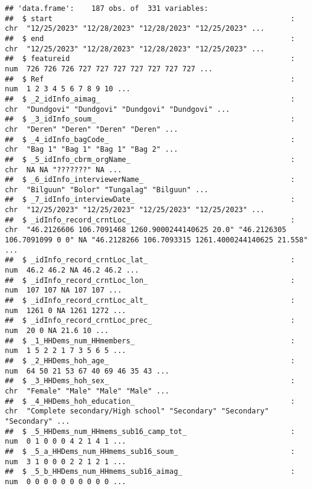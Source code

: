 \documentclass[
]{article}
\begin{document}
\begin{verbatim}
## 'data.frame':    187 obs. of  331 variables:
##  $ start                                                       : chr  "12/25/2023" "12/28/2023" "12/28/2023" "12/25/2023" ...
##  $ end                                                         : chr  "12/25/2023" "12/28/2023" "12/28/2023" "12/25/2023" ...
##  $ featureid                                                   : num  726 726 726 727 727 727 727 727 727 727 ...
##  $ Ref                                                         : num  1 2 3 4 5 6 7 8 9 10 ...
##  $ _2_idInfo_aimag_                                            : chr  "Dundgovi" "Dundgovi" "Dundgovi" "Dundgovi" ...
##  $ _3_idInfo_soum_                                             : chr  "Deren" "Deren" "Deren" "Deren" ...
##  $ _4_idInfo_bagCode_                                          : chr  "Bag 1" "Bag 1" "Bag 1" "Bag 2" ...
##  $ _5_idInfo_cbrm_orgName_                                     : chr  NA NA "???????" NA ...
##  $ _6_idInfo_interviewerName_                                  : chr  "Bilguun" "Bolor" "Tungalag" "Bilguun" ...
##  $ _7_idInfo_interviewDate_                                    : chr  "12/25/2023" "12/25/2023" "12/25/2023" "12/25/2023" ...
##  $ _idInfo_record_crntLoc_                                     : chr  "46.2126606 106.7091468 1260.9000244140625 20.0" "46.2126305 106.7091099 0 0" NA "46.2128266 106.7093315 1261.4000244140625 21.558" ...
##  $ _idInfo_record_crntLoc_lat_                                 : num  46.2 46.2 NA 46.2 46.2 ...
##  $ _idInfo_record_crntLoc_lon_                                 : num  107 107 NA 107 107 ...
##  $ _idInfo_record_crntLoc_alt_                                 : num  1261 0 NA 1261 1272 ...
##  $ _idInfo_record_crntLoc_prec_                                : num  20 0 NA 21.6 10 ...
##  $ _1_HHDems_num_HHmembers_                                    : num  1 5 2 2 1 7 3 5 6 5 ...
##  $ _2_HHDems_hoh_age_                                          : num  64 50 21 53 67 40 69 46 35 43 ...
##  $ _3_HHDems_hoh_sex_                                          : chr  "Female" "Male" "Male" "Male" ...
##  $ _4_HHDems_hoh_education_                                    : chr  "Complete secondary/High school" "Secondary" "Secondary" "Secondary" ...
##  $ _5_HHDems_num_HHmems_sub16_camp_tot_                        : num  0 1 0 0 0 4 2 1 4 1 ...
##  $ _5_a_HHDems_num_HHmems_sub16_soum_                          : num  3 1 0 0 0 2 2 1 2 1 ...
##  $ _5_b_HHDems_num_HHmems_sub16_aimag_                         : num  0 0 0 0 0 0 0 0 0 0 ...

\end{verbatim}
\end{document}

